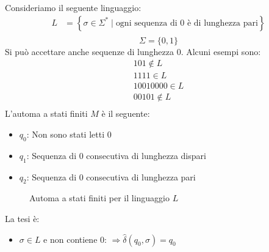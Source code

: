 \documentclass[a4paper]{article}
\begin{document}
\begin{exercise}
  Consideriamo il seguente linguaggio:
  \[
    \begin{aligned}
      L &= \left\{ \sigma \in \Sigma^* \;\left|\; \text{ogni sequenza di } 0 \text{ è di lunghezza pari} \right.\right\}\\
    \end{aligned}
  \] 
  \[
    \Sigma = \{0,1\}
  \] 
  Si può accettare anche sequenze di lunghezza 0. Alcuni esempi sono:
  \[
    \begin{aligned}
      101 \notin L\\
      1111 \in L\\
      10010000 \in L\\
      00101 \notin L\\
    \end{aligned}
  \] 
  L'automa a stati finiti \( M \) è il seguente:
  \begin{itemize}
    \item \( q_0 \): Non sono stati letti 0
    \item \( q_1 \): Sequenza di 0 consecutiva di lunghezza dispari
    \item \( q_2 \): Sequenza di 0 consecutiva di lunghezza pari
  \end{itemize}
  \begin{figure}[H]
    \centering
    \caption{Automa a stati finiti per il linguaggio \( L \)}
  \end{figure}
  \noindent
  La tesi è:
  \begin{itemize}
    \item \( \sigma \in L \) e non contiene 0:
      \(
        \Rightarrow \hat{\delta}(q_0, \sigma) = q_0
      \) 


\end{itemize}
\end{exercise}
\end{document}
